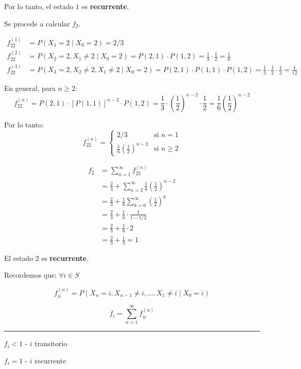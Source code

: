 \documentclass[12pt,a4paper]{article}
\begin{document}
Por lo tanto, el estado $1$ es \textbf{recurrente}.

Se procede a calcular $f_2$.

\begin{align*}
f_{22}^{(1)} &= P(X_1=2 \mid X_0=2) = 2/3 \\
f_{22}^{(2)} &= P(X_2=2, X_1 \neq 2 \mid X_0=2) = P(2,1) \cdot P(1,2) = \frac{1}{3} \cdot \frac{1}{2} = \frac{1}{6} \\
f_{22}^{(3)} &= P(X_3=2, X_2 \neq 2, X_1 \neq 2 \mid X_0=2) = P(2,1) \cdot P(1,1) \cdot P(1,2) = \frac{1}{3} \cdot \frac{1}{2} \cdot \frac{1}{2} = \frac{1}{12}
\end{align*}

En general, para $n \geq 2$:
\begin{equation*}
f_{22}^{(n)} = P(2,1) \cdot [P(1,1)]^{n-2} \cdot P(1,2) = \frac{1}{3} \cdot \left(\frac{1}{2}\right)^{n-2} \cdot \frac{1}{2} = \frac{1}{6} \left(\frac{1}{2}\right)^{n-2}
\end{equation*}

Por lo tanto:
\begin{equation*}
f_{22}^{(n)} = \begin{cases}
2/3 & \text{si } n = 1 \\
\frac{1}{6} \left(\frac{1}{2}\right)^{n-2} & \text{si } n \geq 2
\end{cases}
\end{equation*}

\begin{align*}
f_2 &= \sum_{n=1}^{\infty} f_{22}^{(n)} \\
&= \frac{2}{3} + \sum_{n=2}^{\infty} \frac{1}{6} \left(\frac{1}{2}\right)^{n-2} \\
&= \frac{2}{3} + \frac{1}{6} \sum_{k=0}^{\infty} \left(\frac{1}{2}\right)^k \\
&= \frac{2}{3} + \frac{1}{6} \cdot \frac{1}{1 - 1/2} \\
&= \frac{2}{3} + \frac{1}{6} \cdot 2 \\
&= \frac{2}{3} + \frac{1}{3} = 1
\end{align*}

El estado $2$ es \textbf{recurrente}.


\begin{mdframed}[
    backgroundcolor=blue!10,
    linecolor=blue,
    linewidth=1pt,
    roundcorner=5pt,
    innertopmargin=10pt,
    innerbottommargin=10pt,
    innerleftmargin=10pt,
    innerrightmargin=10pt
]
Recordemos que: $ \forall i \in S$

\begin{equation}
f_{ii}^{(n)} = P(X_n=i, X_{n-1} \neq i, \dots, X_1 \neq i \mid X_0=i)
\end{equation}

\begin{equation}
f_i = \sum_{n=1}^{\infty} f_{ii}^{(n)}
\end{equation}

\rule{0.4\textwidth}{0.4pt}

$f_i < 1$ - $i$ transitorio

$f_i = 1$ - $i$ recurrente
\end{mdframed}
\end{document}
